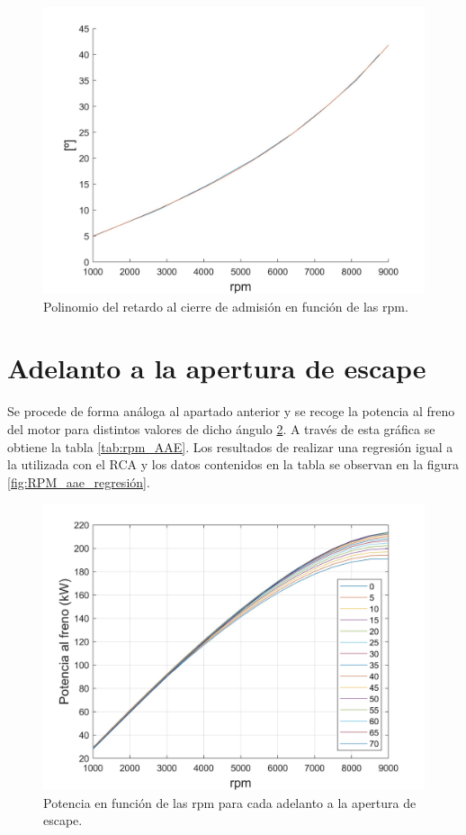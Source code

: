 \begin{figure}[H]
    \centering
    \includegraphics[width=0.6\linewidth]{Figures/01/regresion_rca.jpg}
    \caption{Polinomio del retardo al cierre de admisión en función de las rpm.}
    \label{fig:RPM_rca_regresión}
\end{figure}







\section{Adelanto a la apertura de escape} \label{s:section_04}

Se procede de forma análoga al apartado anterior y se recoge la potencia al freno del motor para distintos valores de dicho ángulo \ref{fig:RPM_aae}. A través de esta gráfica se obtiene la tabla \ref{tab:rpm_AAE}. Los resultados de realizar una regresión igual a la utilizada con el RCA y los datos contenidos en la tabla se observan en la figura \ref{fig:RPM_aae_regresión}.

\begin{figure}[H]
    \centering
    \includegraphics[width=0.6\linewidth]{Figures/01/Potencia_rpm_aae.jpg}
    \caption{Potencia en función de las rpm para cada adelanto a la apertura de escape.}
    \label{fig:RPM_aae}
\end{figure}


